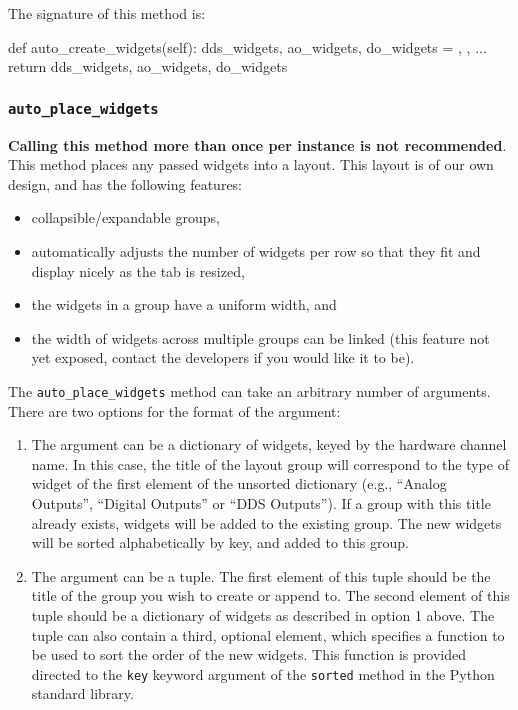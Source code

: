 \documentclass[12pt]{article}
\begin{document}
The signature of this method is:
\begin{python}
def auto_create_widgets(self):
    dds_widgets, ao_widgets, do_widgets = {}, {}, {}
    ...
    return dds_widgets, ao_widgets, do_widgets
\end{python}

\subsubsection{\texttt{auto\_place\_widgets}}\label{ref:auto_place_widgets}
\textbf{Calling this method more than once per instance is not recommended}.
This method places any passed widgets into a layout.
This layout is of our own design, and has the following features:
\begin{itemize}
	\item collapsible/expandable groups,
	\item automatically adjusts the number of widgets per row so that they fit and display nicely as the tab is resized,
	\item the widgets in a group have a uniform width, and
	\item the width of widgets across multiple groups can be linked (this feature not yet exposed, contact the developers if you would like it to be).
\end{itemize}

The \texttt{auto\_place\_widgets} method can take an arbitrary number of arguments.
There are two options for the format of the argument:

\begin{enumerate}
	\item The argument can be a dictionary of widgets, keyed by the hardware channel name. 
	In this case, the title of the layout group will correspond to the type of widget of the first element of the unsorted dictionary (e.g., ``Analog Outputs'', ``Digital Outputs'' or ``DDS Outputs'').
	If a group with this title already exists, widgets will be added to the existing group.
	The new widgets will be sorted alphabetically by key, and added to this group.
	
	\item The argument can be a tuple. 
	The first element of this tuple should be the title of the group you wish to create or append to.
	The second element of this tuple should be a dictionary of widgets as described in option 1 above.
	The tuple can also contain a third, optional element, which specifies a function to be used to sort the order of the new widgets.
	This function is provided directed to the \texttt{key} keyword argument of the \texttt{sorted} method in the Python standard library.
\end{enumerate}
\end{document}
